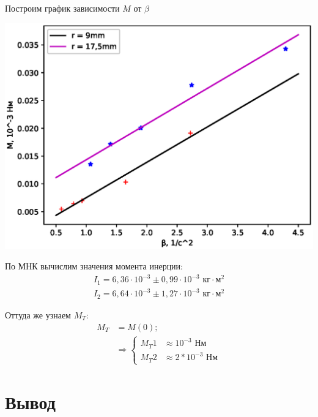 \documentclass[a4paper, 12pt]{article}
\begin{document}
\newpage

Построим график зависимости $M$ от $\beta$

\includegraphics[scale = 0.7]{Plot.eps}

По МНК вычислим значения момента инерции:
\begin{align*}
I_1 = 6,36 \cdot 10^{-3} \pm 0,99 \cdot 10^{-3} \text{ кг$\cdot$м$^2$} \\
I_2 = 6,64 \cdot 10^{-3} \pm 1,27 \cdot 10^{-3} \text{ кг$\cdot$м$^2$}
\end{align*}

Оттуда же узнаем $M_T$:
\begin{align*}
M_T &= M(0); \\
&\Rightarrow 
\left\{
\begin{aligned}
M_T1 &\approx 10^{-3} \text{ Нм} \\
M_T2 &\approx 2*10^{-3} \text{ Нм}
\end{aligned}
\right.
\end{align*}

\section{Вывод}
\end{document}
